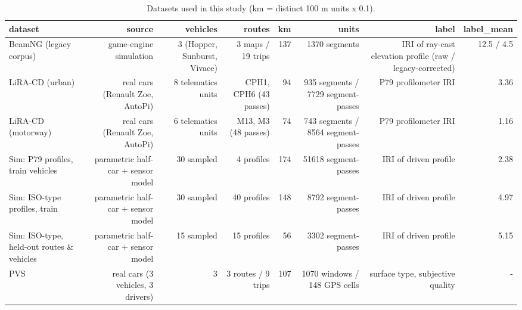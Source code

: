 \begin{table}[!htbp]
\centering
\footnotesize
\caption{Datasets used in this study (km = distinct 100 m units x 0.1).}
\label{tab:datasets}
\begin{adjustbox}{max width=\columnwidth}
\begin{tabular}{lrrrrrrr}
\toprule
\textbf{dataset} & \textbf{source} & \textbf{vehicles} & \textbf{routes} & \textbf{km} & \textbf{units} & \textbf{label} & \textbf{label\_mean} \\
\midrule
BeamNG (legacy corpus) & game-engine simulation & 3 (Hopper, Sunburst, Vivace) & 3 maps / 19 trips & 137 & 1370 segments & IRI of ray-cast elevation profile (raw / legacy-corrected) & 12.5 / 4.5 \\
LiRA-CD (urban) & real cars (Renault Zoe, AutoPi) & 8 telematics units & CPH1, CPH6 (43 passes) & 94 & 935 segments / 7729 segment-passes & P79 profilometer IRI & 3.36 \\
LiRA-CD (motorway) & real cars (Renault Zoe, AutoPi) & 6 telematics units & M13, M3 (48 passes) & 74 & 743 segments / 8564 segment-passes & P79 profilometer IRI & 1.16 \\
Sim: P79 profiles, train vehicles & parametric half-car + sensor model & 30 sampled & 4 profiles & 174 & 51618 segment-passes & IRI of driven profile & 2.38 \\
Sim: ISO-type profiles, train & parametric half-car + sensor model & 30 sampled & 40 profiles & 148 & 8792 segment-passes & IRI of driven profile & 4.97 \\
Sim: ISO-type, held-out routes \& vehicles & parametric half-car + sensor model & 15 sampled & 15 profiles & 56 & 3302 segment-passes & IRI of driven profile & 5.15 \\
PVS & real cars (3 vehicles, 3 drivers) & 3 & 3 routes / 9 trips & 107 & 1070 windows / 148 GPS cells & surface type, subjective quality & - \\
\bottomrule
\end{tabular}
\end{adjustbox}
\end{table}

